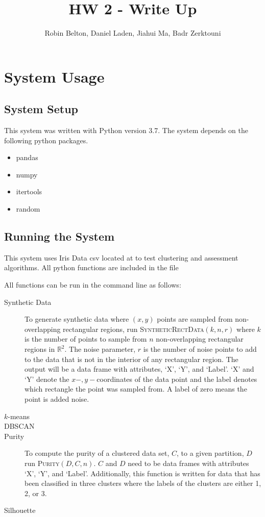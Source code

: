 \documentclass[psamsfonts,onesided,10pt]{amsart}
\title{HW 2 - Write Up}
\author{Robin Belton, Daniel Laden, Jiahui Ma,  Badr Zerktouni}
\begin{document}
\maketitle

\section{System Usage}
\subsection{System Setup}
This system was written with Python version 3.7. The system depends on the following python packages.

\begin{itemize}
    \item pandas
    \item numpy
    \item itertools 
    \item random
\end{itemize}

\subsection{Running the System}
This system uses Iris Data csv located at  
to test clustering and assessment algorithms. All python functions are included in the  file 

All functions can be run in the command line as follows:

\begin{description}
\item[Synthetic Data] To generate synthetic data where $(x,y)$ points are sampled from 
non-overlapping rectangular regions, run \textsc{SyntheticRectData}$(k,n,r)$ where $k$ is the 
number of points to sample from $n$ non-overlapping rectangular regions in $\mathbb{R}^2$. 
The noise parameter, $r$  is the number of noise points to add to the data that is not in the interior 
of any rectangular region. The output will be a data frame with attributes, `X', `Y', and `Label'. 
`X' and `Y' denote the $x-,y-$coordinates of the data point and the label denotes which rectangle 
the point was sampled from. A label of zero means the point is added noise.
\item[$k$-means] \todo{}
\item[DBSCAN] \todo{}
\item[Purity]  To compute the purity of a clustered data set, $C$, to a given partition, $D$ run 
\textsc{Purity}$(D, C, n)$. $C$ and $D$ need to be data frames with 
attributes `X',  `Y', and `Label'. Additionally, this function is written for data that has been 
classified in three clusters where the labels of the clusters are either 1, 2, or 3. 
\item[Silhouette] \todo{}
\end{description}
 
\end{document}
